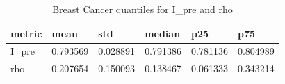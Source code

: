 \begin{table}[h]
\centering
\caption{Breast Cancer quantiles for I\_pre and rho}
\label{tab:breast\_quantiles}
\begin{tabular}{|l|l|l|l|l|l|}
\hline
metric & mean & std & median & p25 & p75 \\
\hline
I\_pre & 0.793569 & 0.028891 & 0.791386 & 0.781136 & 0.804989 \\
\hline
rho & 0.207654 & 0.150093 & 0.138467 & 0.061333 & 0.343214 \\
\hline
\end{tabular}
\end{table}
